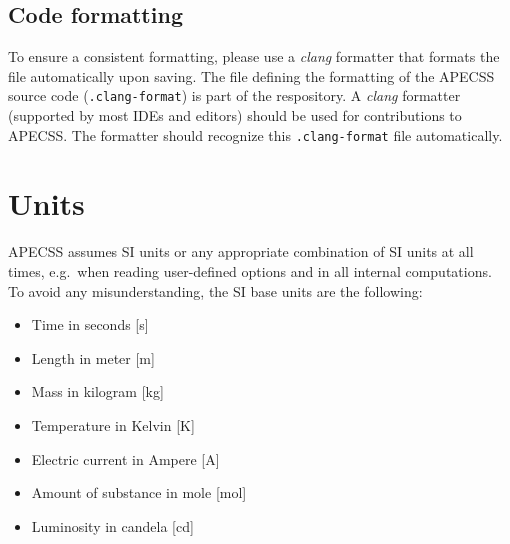 \subsection{Code formatting}
\label{sec:clang}

To ensure a consistent formatting, please use a \textit{clang} formatter that formats the file automatically upon saving. The file defining the formatting of the APECSS source code ({\tt .clang-format}) is part of the respository. A \textit{clang} formatter (supported by most IDEs and editors) should be used for contributions to APECSS. The formatter should recognize this {\tt .clang-format} file automatically.

\section{Units}

APECSS assumes SI units or any appropriate combination of SI units at all times, e.g.~when reading user-defined options and in all internal computations. To avoid any misunderstanding, the SI base units are the following:\vspace{-1em}
\begin{itemize}[noitemsep]
  \item Time in seconds [s]
  \item Length in meter [m]
  \item Mass in kilogram [kg]
  \item Temperature in Kelvin [K]
  \item Electric current in Ampere [A] 
  \item Amount of substance in mole [mol]
  \item Luminosity in candela [cd]
\end{itemize}

